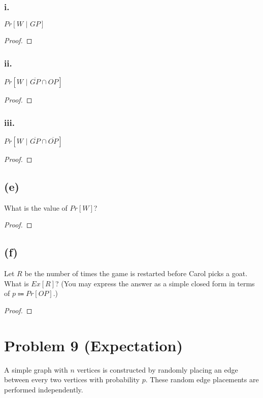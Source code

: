 \documentclass[14pt]{extarticle}
\begin{document}
\subsubsection{i.}
$Pr[W \,\,|\,\, GP]$
\begin{proof}
\end{proof}

\subsubsection{ii.}
$Pr[W \,\,|\,\, \overline{GP}\cap OP]$
\begin{proof}
\end{proof}

\subsubsection{iii.}
$Pr[W \,\,|\,\, \overline{GP}\cap \overline{OP}]$
\begin{proof}
\end{proof}

\subsection{(e)}
What is the value of $Pr[W]$?
\begin{proof}
\end{proof}

\subsection{(f)}
Let $R$ be the number of times the game is restarted before Carol picks a goat. What is $Ex[R]$? (You may express the answer as a simple closed form in terms of $p \Coloneqq Pr[OP]$.)
\begin{proof}
\end{proof}

\section{Problem 9 (Expectation)}
A simple graph with $n$ vertices is constructed by randomly placing an edge between every two vertices with probability $p$. These random edge placements are performed independently.
\end{document}
